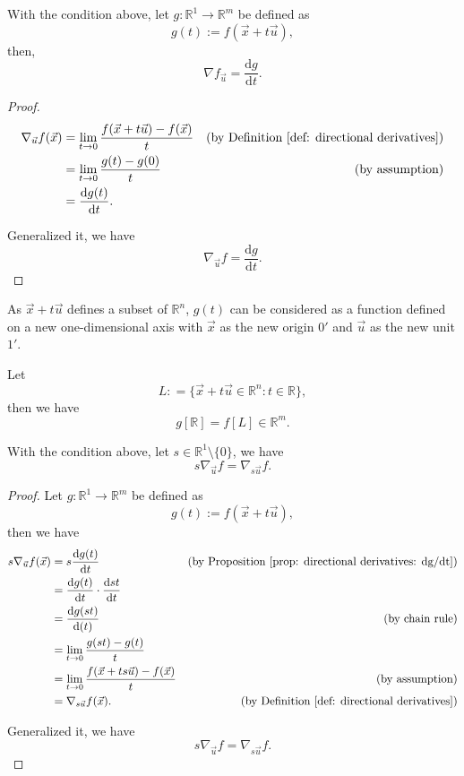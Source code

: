 \begin{proposition}
	\label{prop: directional derivatives: dg/dt}
	With the condition above, let $g: \mathbb R^1 \to \mathbb R^m$ be defined as
	$$
	g(t) := f(\vec x + t\vec u),
	$$
	then,
	$$
	\nabla f_{\vec u} = \frac{\mathrm d g}{\mathrm d t}.
	$$
	
	\begin{proof}
		$$
		\begin{aligned}
			\nabla_{\vec u} f (\vec x) &= \lim_{t \to 0} \frac{f(\vec x + t \vec u) - f(\vec x)}{t} &\text{(by Definition \ref{def: directional derivatives})} \\
			&= \lim_{t \to 0} \frac{g(t) - g(0)}{t} &\text{(by assumption)} \\
			&= \frac{\mathrm d g(t)}{\mathrm dt}.
		\end{aligned}
		$$
		
		Generalized it, we have
		$$
		\nabla_{\vec u} f = \frac{\mathrm d g}{\mathrm dt}.
		$$
	\end{proof}
\end{proposition}



\begin{note}
	As $\vec x + t\vec u$ defines a subset of $\mathbb R^n$, $g(t)$ can be considered as a function defined on a new one-dimensional axis with $\vec x$ as the new origin $0'$ and $\vec u$ as the new unit $1'$.

	Let
	$$
	L : =  \{ \vec x + t \vec u \in \mathbb R^n : t \in \mathbb R \},
	$$
	then we have
	$$
	g[\mathbb R] = f[L] \in \mathbb R^m.
	$$
\end{note}



\begin{proposition}
	\label{prop: directional derivatives: su}
	With the condition above, let $s \in \mathbb R^1 \setminus \{0\}$, we have
	$$
	s\nabla_{\vec u} f = \nabla_{s\vec u} f.
	$$
	
	\begin{proof}
		Let $g: \mathbb R^1 \to \mathbb R^m$ be defined as
		$$
		g(t) := f(\vec x + t \vec u),
		$$
		then we have
		$$
		\begin{aligned}
			s \nabla_{\vec u} f(\vec x) &= s \frac{\mathrm d g(t)}{\mathrm d t} &\text{(by Proposition \ref{prop: directional derivatives: dg/dt})} \\
			&= \frac{\mathrm d g(t)}{\mathrm dt} \cdot \frac{\mathrm d st}{\mathrm d t} \\
			&= \frac{\mathrm d g(st)}{\mathrm d(t)} &\text{(by chain rule)} \\
			&= \lim_{t \to 0} \frac{g(st) - g(t)}{t} \\
			&= \lim_{t \to 0} \frac{f(\vec x + t s \vec u) - f(\vec x)}{t} &\text{(by assumption)} \\
			&= \nabla_{s \vec u} f(\vec x). & \text{(by Definition \ref{def: directional derivatives})}
		\end{aligned}
		$$
		
		Generalized it, we have
		$$
		s\nabla_{\vec u} f = \nabla_{s\vec u} f.
		$$
	\end{proof}
\end{proposition}



